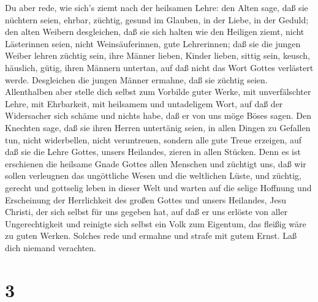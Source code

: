  Du aber rede, wie sich's ziemt nach der heilsamen Lehre:
 den Alten sage, daß sie nüchtern seien, ehrbar, züchtig,
gesund im Glauben, in der Liebe, in der Geduld;  den alten
Weibern desgleichen, daß sie sich halten wie den Heiligen ziemt, nicht
Lästerinnen seien, nicht Weinsäuferinnen, gute Lehrerinnen; 
daß sie die jungen Weiber lehren züchtig sein, ihre Männer lieben,
Kinder lieben,  sittig sein, keusch, häuslich, gütig, ihren
Männern untertan, auf daß nicht das Wort Gottes verlästert werde.
 Desgleichen die jungen Männer ermahne, daß sie züchtig
seien.  Allenthalben aber stelle dich selbst zum Vorbilde
guter Werke, mit unverfälschter Lehre, mit Ehrbarkeit,  mit
heilsamem und untadeligem Wort, auf daß der Widersacher sich schäme und
nichts habe, daß er von uns möge Böses sagen.  Den Knechten
sage, daß sie ihren Herren untertänig seien, in allen Dingen zu Gefallen
tun, nicht widerbellen,  nicht veruntreuen, sondern alle
gute Treue erzeigen, auf daß sie die Lehre Gottes, unsers Heilandes,
zieren in allen Stücken.  Denn es ist erschienen die
heilsame Gnade Gottes allen Menschen  und züchtigt uns, daß
wir sollen verleugnen das ungöttliche Wesen und die weltlichen Lüste,
und züchtig, gerecht und gottselig leben in dieser Welt 
und warten auf die selige Hoffnung und Erscheinung der Herrlichkeit des
großen Gottes und unsers Heilandes, Jesu Christi,  der sich
selbst für uns gegeben hat, auf daß er uns erlöste von aller
Ungerechtigkeit und reinigte sich selbst ein Volk zum Eigentum, das
fleißig wäre zu guten Werken.  Solches rede und ermahne und
strafe mit gutem Ernst. Laß dich niemand verachten.

\hypertarget{section-2}{%
\section{3}\label{section-2}}

